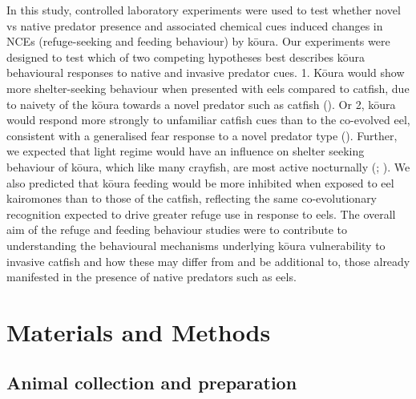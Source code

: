 \documentclass[
  letterpaper,
  DIV=11,
  numbers=noendperiod]{scrartcl}
\begin{document}
In this study, controlled laboratory experiments were used to test
whether novel vs native predator presence and associated chemical cues
induced changes in NCEs (refuge-seeking and feeding behaviour) by kōura.
Our experiments were designed to test which of two competing hypotheses
best describes kōura behavioural responses to native and invasive
predator cues. 1. Kōura would show more shelter-seeking behaviour when
presented with eels compared to catfish, due to naivety of the kōura
towards a novel predator such as catfish
(). Or 2, kōura would
respond more strongly to unfamiliar catfish cues than to the co-evolved
eel, consistent with a generalised fear response to a novel predator
type (). Further, we expected
that light regime would have an influence on shelter seeking behaviour
of kōura, which like many crayfish, are most active nocturnally
(;
). We also predicted
that kōura feeding would be more inhibited when exposed to eel
kairomones than to those of the catfish, reflecting the same
co-evolutionary recognition expected to drive greater refuge use in
response to eels. The overall aim of the refuge and feeding behaviour
studies were to contribute to understanding the behavioural mechanisms
underlying kōura vulnerability to invasive catfish and how these may
differ from and be additional to, those already manifested in the
presence of native predators such as eels.

\section{Materials and Methods}\label{materials-and-methods}

\subsection{Animal collection and
preparation}\label{animal-collection-and-preparation}
\end{document}
